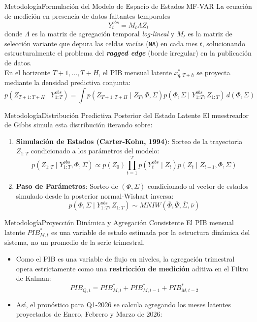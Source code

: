 \documentclass{beamer}
\begin{document}
\begin{frame}{Metodología}{Formulación del Modelo de Espacio de Estados MF-VAR}\justifying
La ecuación de medición en presencia de datos faltantes temporales \pause
\[
Y_t^{obs} = M_t \Lambda Z_t
\] \pause
donde $\Lambda$ es la matriz de agregación temporal \textit{log-lineal} y $M_t$ es la matriz de selección variante que depura las celdas vacías (\texttt{NA}) en cada mes $t$, solucionando estructuralmente el problema del \textbf{\textit{ragged edge}} (borde irregular) en la publicación de datos. \\ \pause
En el horizonte $T+1, \dots, T+H$, el PIB mensual latente $x_{q, T+h}^*$ se proyecta mediante la densidad predictiva conjunta:  \pause \small{
\[
p(Z_{T+1:T+H} \mid Y_{1:T}^{obs}) = \int p(Z_{T+1:T+H} \mid Z_T, \Phi, \Sigma) p(\Phi, \Sigma \mid Y_{1:T}^{obs}, Z_{1:T}) \, d(\Phi, \Sigma)
\]}
\end{frame}

\begin{frame}{Metodología}{Distribución Predictiva Posterior del Estado Latente}\justifying
El muestreador de Gibbs simula esta distribución iterando sobre: \pause
\begin{enumerate}\justifying
    \item \textbf{Simulación de Estados (Carter-Kohn, 1994)}: Sorteo de la trayectoria $Z_{1:T}$ condicionado a los parámetros del modelo: \pause
    \[
    p(Z_{1:T} \mid Y_{1:T}^{obs}, \Phi, \Sigma) \propto p(Z_0) \prod_{t=1}^T p(Y_t^{obs} \mid Z_t) p(Z_t \mid Z_{t-1}, \Phi, \Sigma)
    \]
    \item \textbf{Paso de Parámetros}: Sorteo de $(\Phi, \Sigma)$ condicionado al vector de estados simulado desde la posterior normal-Wishart inversa: \pause
    \[
    p(\Phi, \Sigma \mid Y_{1:T}^{obs}, Z_{1:T}) \sim MNIW(\bar{\Phi}, \bar{\Psi}, \bar{\Sigma}, \bar{\nu})
    \]
\end{enumerate}
\end{frame}


\begin{frame}{Metodología}{Proyección Dinámica y Agregación Consistente}\justifying
El PIB mensual latente $PIB_{M,t}^*$ es una variable de estado estimada por la estructura dinámica del sistema, no un promedio de la serie trimestral. \pause
\begin{itemize}\justifying
    \item Como el PIB es una variable de flujo en niveles, la agregación trimestral opera estrictamente como una \textbf{restricción de medición} aditiva en el Filtro de Kalman: \pause
    \[
    PIB_{Q, t} = PIB_{M, t}^* + PIB_{M, t-1}^* + PIB_{M, t-2}^*
		\]
    \item Así, el pronóstico para Q1-2026 se calcula agregando los meses latentes proyectados de Enero, Febrero y Marzo de 2026:
\end{itemize}
\end{frame}
\end{document}
